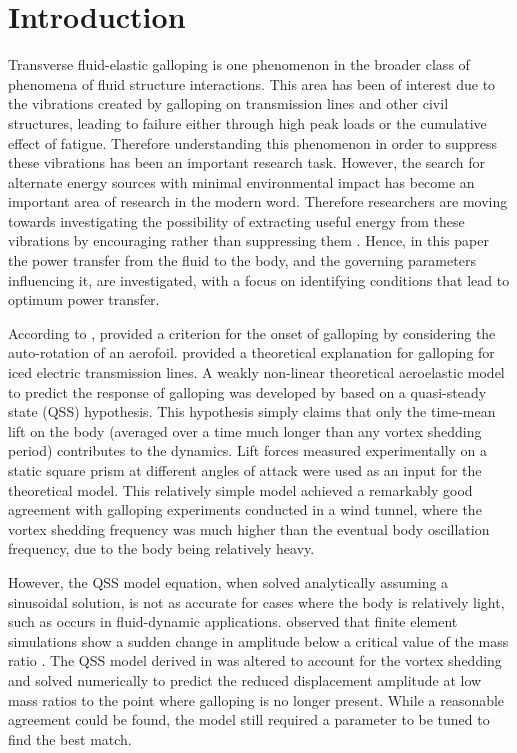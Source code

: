 \section{Introduction} 
 
Transverse fluid-elastic galloping is one phenomenon in the broader class of phenomena of fluid structure interactions. This area has been of interest due to the vibrations created by galloping on transmission lines \citep{Parkinson1964} and other civil structures, leading to failure either through high peak loads or the cumulative effect of fatigue. Therefore understanding this phenomenon in order to suppress these vibrations has been an important research task. However, the search for alternate energy sources with minimal environmental impact has become an important area of research in the modern word. Therefore researchers are moving towards investigating the possibility of extracting useful energy from these vibrations by encouraging rather than suppressing them \citep{Barrero-Gil2010a}. Hence, in this paper the power transfer from the fluid to the body, and the governing parameters influencing it, are investigated, with a focus on identifying conditions that lead to optimum power transfer.

According to \citet{Paidoussis2010}, \citet{Glauert1919} provided a criterion for the onset of galloping by considering the auto-rotation of an aerofoil.  \citet{DenHartog1956} provided a theoretical explanation for galloping for iced electric transmission lines. A weakly non-linear theoretical aeroelastic model to predict the response of galloping was developed by \citet{Parkinson1964} based on a quasi-steady state (QSS) hypothesis. This hypothesis simply claims that only the time-mean lift on the body (averaged over a time much longer than any vortex shedding period) contributes to the dynamics. Lift forces measured experimentally on a static square prism at different angles of attack were used as an input for the theoretical model. This relatively simple model achieved a remarkably good agreement with galloping experiments conducted in a wind tunnel, where the vortex shedding frequency was much higher than the eventual body oscillation frequency, due to the body being relatively heavy.

However, the QSS model equation, when solved analytically assuming a sinusoidal solution, is not as accurate for cases where the body is relatively light, such as occurs in fluid-dynamic applications. \citet{Joly2012} observed that finite element simulations show a sudden change in amplitude below a critical value of the mass ratio \mstar. The QSS model derived in \citet{Parkinson1964} was altered to account for the vortex shedding and solved numerically to predict the reduced displacement amplitude at low mass ratios to the point where galloping is no longer present. While a reasonable agreement could be found, the model still required a parameter to be tuned to find the best match. 

